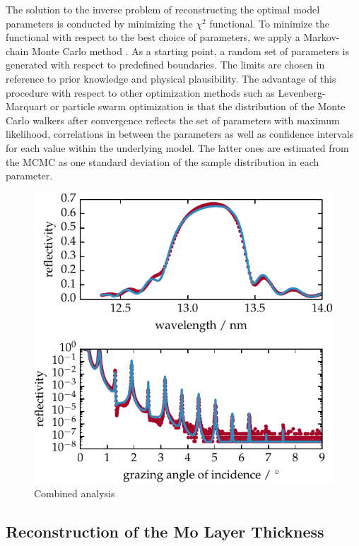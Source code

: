 The solution to the inverse problem of reconstructing the optimal model parameters is conducted by minimizing the $\chi^2$ functional. To minimize the functional with respect to the best choice of parameters, we apply a Markov-chain Monte Carlo method \cite{goodman_ensemble_2010,foreman-mackey_emcee:_2013,haase_multiparameter_2016}. As a starting point, a random set of parameters is generated with respect to predefined boundaries. The limits are chosen in reference to prior knowledge and physical plausibility. The advantage of this procedure with respect to other optimization methods such as Levenberg-Marquart \cite{levenberg_method_1944,marquardt_algorithm_1963} or particle swarm optimization \cite{kennedy_particle_2011} is that the distribution of the Monte Carlo walkers after convergence reflects the set of parameters with maximum likelihood, correlations in between the parameters as well as confidence intervals for each value within the underlying model. The latter ones are estimated from the MCMC as one standard deviation of the sample distribution in each parameter.
\begin{figure}[htbp]
\centering
\includegraphics{img/PS5657}
\caption{Combined analysis}
\label{ch_spec:fig_EUV_XRR_combined}
\end{figure}


\subsection{Reconstruction of the Mo Layer Thickness}
